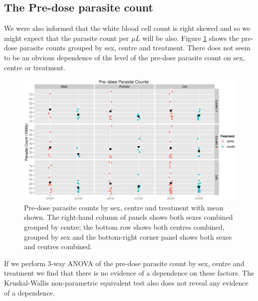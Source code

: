 \subsection{The Pre-dose parasite count}
We were also informed that the white blood cell count is right skewed and so we might expect that the parasite count per $\mu L$ will be also.
Figure \ref{preaov} shows the pre-dose parasite counts grouped by sex, centre and treatment. There does not seem to be an obvious dependence of the level of the pre-dose parasite count on sex, centre or treatment.
\begin{figure}[h]
\begin{center}
\includegraphics[width=6.1in]{preaov.eps}
\caption{Pre-dose parasite counts by sex, centre and treatment with mean shown. The right-hand column of panels shows both sexes combined grouped by centre; the bottom row shows both centres combined, grouped by sex and the bottom-right corner panel shows both sexes and centres combined.}
\label{preaov}
\end{center}
\end{figure}

If we perform 3-way ANOVA of the pre-dose parasite count by sex, centre and treatment we find that there is no evidence of a dependence on these factors. The Kruskal-Wallis non-parametric equivalent test also does not reveal any evidence of a dependence.

